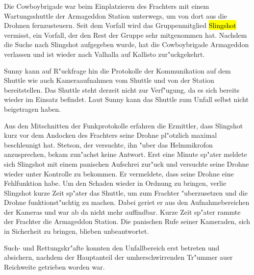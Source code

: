 Die Cowboybrigade war beim Einplatzieren des Frachters mit einem Wartungsshuttle der Armageddon Station unterwegs, um von dort aus die Drohnen fernzusteuern. Seit dem Vorfall wird das Gruppenmitglied \hl{Slingshot} vermisst, ein Vorfall, der den Rest der Gruppe sehr mitgenommen hat. Nachdem die Suche nach Slingshot aufgegeben wurde, hat die Cowboybrigade Armageddon verlassen und ist wieder nach Valhalla auf Kallisto zur"uckgekehrt.

Sunny kann auf R"uckfrage hin die Protokolle der Kommunikation auf dem Shuttle wie auch Kameraaufnahmen vom Shuttle und von der Station bereitstellen. Das Shuttle steht derzeit nicht zur Verf"ugung, da es sich bereits wieder im Einsatz befindet. Laut Sunny kann das Shuttle zum Unfall selbst nicht beigetragen haben.

Aus den Mitschnitten der Funkprotokolle erfahren die Ermittler, dass Slingshot kurz vor dem Andocken des Frachters seine Drohne pl"otzlich maximal beschleunigt hat. Stetson, der versuchte, ihn "uber das Helmmikrofon anzusprechen, bekam zun"achst keine Antwort. Erst eine Minute sp"ater meldete sich Slingshot mit einem panischen Aufschrei zur"uck und versuchte seine Drohne wieder unter Kontrolle zu bekommen. Er vermeldete, dass seine Drohne eine Fehlfunktion habe. Um den Schaden wieder in Ordnung zu bringen, verlie\3 Slingshot kurze Zeit sp"ater das Shuttle, um zum Frachter "uberzusetzen und die Drohne funktionst"uchtig zu machen. Dabei geriet er aus den Aufnahmebereichen der Kameras und war ab da nicht mehr auffindbar. Kurze Zeit sp"ater rammte der Frachter die Armageddon Station. Die panischen Rufe seiner Kameraden, sich in Sicherheit zu bringen, blieben unbeantwortet.

Such- und Rettungskr"afte konnten den Unfallbereich erst betreten und absichern, nachdem der Hauptanteil der umherschwirrenden Tr"ummer au\3er Reichweite getrieben worden war.


